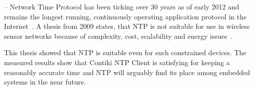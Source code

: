


--
Network Time Protocol has been ticking over 30 years as of early 2012
and remains the longest running, continuously operating application
protocol in the Internet~\cite{ntp-y2k}.
A thesis from 2009 states, that NTP is
not suitable for use in wireless sensor networks because of complexity, cost,
scalability and energy issues~\cite{thesis-sync}.

This thesis showed that NTP is suitable even for such constrained devices.
The measured results show that Contiki NTP Client is satisfying for keeping a reasonably accurate time
and NTP will arguably find its place among embedded systems in the near future.
